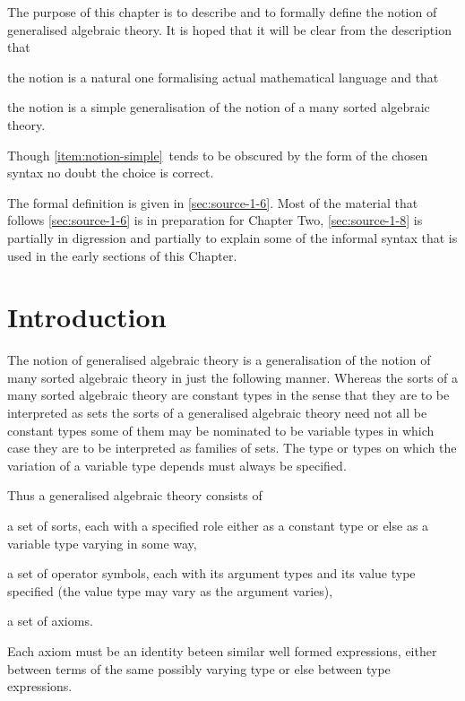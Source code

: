 
The purpose of this chapter is to describe and to formally define the notion of generalised algebraic theory.
%
It is hoped that it will be clear from the description that \begin{enumerate*}[(i)] \item the notion is a natural one formalising actual mathematical language and that \item \label{item:notion-simple} the notion is a simple generalisation of the notion of a many sorted algebraic theory. \end{enumerate*}
%
Though \ref{item:notion-simple}\ tends to be obscured by the form of the chosen syntax no doubt the choice is correct.

The formal definition is given in \textsection \ref{sec:source-1-6}.
%
Most of the material that follows \textsection \ref{sec:source-1-6} is in preparation for Chapter Two, \textsection \ref{sec:source-1-8} is partially in digression and partially to explain some of the informal syntax that is used in the early sections of this Chapter.

\section{Introduction} \label{sec:source-1-1}

The notion of generalised algebraic theory is a generalisation of the notion of many sorted algebraic theory in just the following manner.
%
Whereas the sorts of a many sorted algebraic theory are constant types in the sense that they are to be interpreted as sets the sorts of a generalised algebraic theory need not all be constant types some of them may be nominated to be variable types in which case they are to be interpreted as families of sets.
%
The type or types on which the variation of a variable type depends must always be specified.

Thus a generalised algebraic theory consists of \begin{enumerate*}[(i)] \item a set of sorts, each with a specified role either as a constant type or else as a variable type varying in some way, \item a set of operator symbols, each with its argument types and its value type specified (the value type may vary as the argument varies), \item a set of axioms. \end{enumerate*}
%
Each axiom must be an identity beteen similar well formed expressions, either between terms of the same possibly varying type or else between type expressions.

